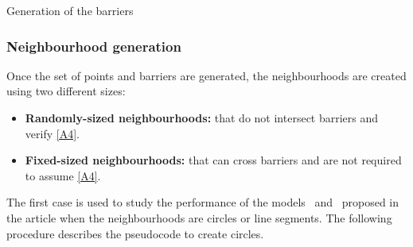 \documentclass[a4paper,  review, authoryear, 1p.]{elsarticle}
\newcommand{\TSPHN}{{\sf{H-TSPHN}\xspace }}
\newcommand{\TSPN}{{\sf{H-TSPN}\xspace }}
\begin{document}
\begin{algorithm}[H]
	\caption{Generation of the barriers}
	\label{alg:Algorithm4}
	
\end{algorithm}

\subsubsection*{Neighbourhood generation}
Once the set of points and barriers are generated, the neighbourhoods are created using two different sizes:
\begin{itemize}
	\item \textbf{Randomly-sized neighbourhoods:} that do not intersect barriers and verify \ref{A4}. 
	\item \textbf{Fixed-sized neighbourhoods:} that can cross barriers and are not required to assume \ref{A4}. 
\end{itemize}
The first case is used to study the performance of the models \TSPHN \ and \TSPN \ proposed in the article when the neighbourhoods are circles or line segments. The following procedure describes the pseudocode to create circles.
\end{document}
